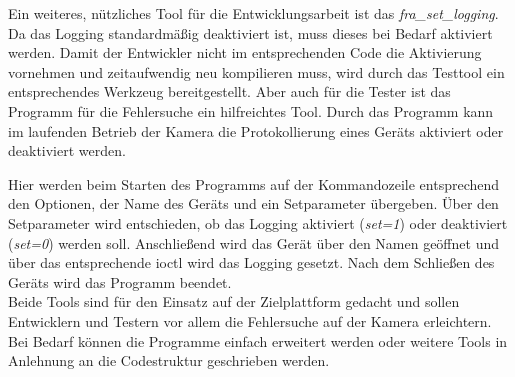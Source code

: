 Ein weiteres, nützliches Tool für die Entwicklungsarbeit ist das \textit{fra\_set\_logging}. Da das Logging standardmäßig deaktiviert ist, muss dieses bei Bedarf aktiviert werden. Damit der Entwickler nicht im entsprechenden Code die Aktivierung vornehmen und zeitaufwendig neu kompilieren muss, wird durch das Testtool ein entsprechendes Werkzeug bereitgestellt. Aber auch für die Tester ist das Programm für die Fehlersuche ein hilfreichtes Tool. Durch das Programm kann im laufenden Betrieb der Kamera die Protokollierung eines Geräts aktiviert oder deaktiviert werden.


Hier werden beim Starten des Programms auf der Kommandozeile entsprechend den Optionen, der Name des Geräts und ein Setparameter übergeben. 
Über den Setparameter wird entschieden, ob das Logging aktiviert (\textit{set=1}) oder deaktiviert (\textit{set=0}) werden soll. Anschließend wird das Gerät über den Namen geöffnet und über das entsprechende \ac{ioctl} wird das Logging gesetzt. Nach dem Schließen des Geräts wird das Programm beendet. \\


Beide Tools sind für den Einsatz auf der Zielplattform gedacht und sollen Entwicklern und Testern vor allem die Fehlersuche auf der Kamera erleichtern. Bei Bedarf können die Programme einfach erweitert werden oder weitere Tools in Anlehnung an die Codestruktur geschrieben werden. 